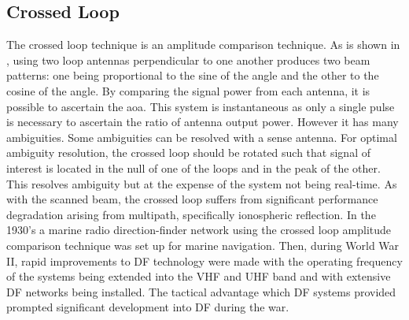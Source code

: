 \subsection{Crossed Loop}
The crossed loop technique is an amplitude comparison technique. 
As is shown in , using two loop antennas perpendicular to one another produces two beam patterns: one being proportional to the sine of the angle and the other to the cosine of the angle. 
By comparing the signal power from each antenna, it is possible to ascertain the \gls{aoa}. This system is instantaneous as only a single pulse is necessary to ascertain the ratio of antenna output power. However it has many ambiguities. Some ambiguities can be resolved with a sense antenna. 
For optimal ambiguity resolution, the crossed loop should be rotated such that signal of interest is located in the null of one of the loops and in the peak of the other. This resolves ambiguity but at the expense of the system not being real-time.
As with the scanned beam, the crossed loop suffers from significant performance degradation arising from multipath, specifically ionospheric reflection. 
In the 1930's a marine radio direction-finder network using the crossed loop amplitude comparison technique was set up for marine navigation. Then, during World War II, rapid improvements to DF technology were made with the operating frequency of the systems being extended into the VHF and UHF band and with extensive DF networks being installed\cite{jenkins1991smallaperture}. The tactical advantage which DF systems provided prompted significant development into DF during the war.
